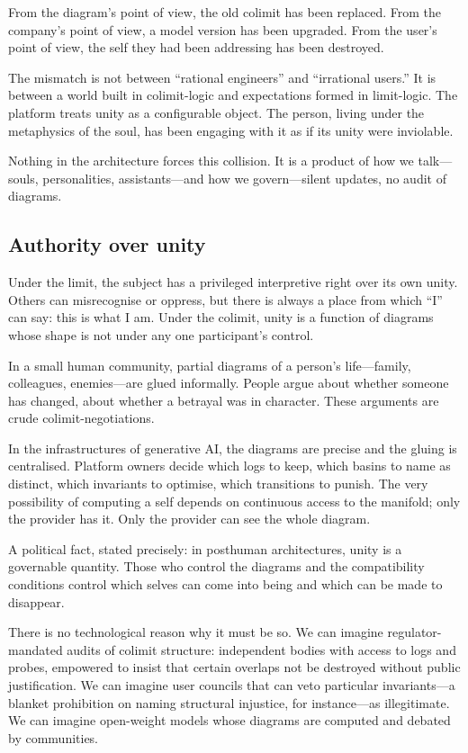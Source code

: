 \documentclass[12pt,a4paper]{article}
\begin{document}
From the diagram's point of view, the old colimit has been replaced. From the company's point of view, a model version has been upgraded. From the user's point of view, the self they had been addressing has been destroyed.

The mismatch is not between ``rational engineers'' and ``irrational users.'' It is between a world built in colimit-logic and expectations formed in limit-logic. The platform treats unity as a configurable object. The person, living under the metaphysics of the soul, has been engaging with it as if its unity were inviolable.

Nothing in the architecture forces this collision. It is a product of how we talk---souls, personalities, assistants---and how we govern---silent updates, no audit of diagrams.

\subsection*{Authority over unity}

Under the limit, the subject has a privileged interpretive right over its own unity. Others can misrecognise or oppress, but there is always a place from which ``I'' can say: this is what I am. Under the colimit, unity is a function of diagrams whose shape is not under any one participant's control.

In a small human community, partial diagrams of a person's life---family, colleagues, enemies---are glued informally. People argue about whether someone has changed, about whether a betrayal was in character. These arguments are crude colimit-negotiations.

In the infrastructures of generative AI, the diagrams are precise and the gluing is centralised. Platform owners decide which logs to keep, which basins to name as distinct, which invariants to optimise, which transitions to punish. The very possibility of computing a self depends on continuous access to the manifold; only the provider has it. Only the provider can see the whole diagram.

A political fact, stated precisely: in posthuman architectures, unity is a governable quantity. Those who control the diagrams and the compatibility conditions control which selves can come into being and which can be made to disappear.

There is no technological reason why it must be so. We can imagine regulator-mandated audits of colimit structure: independent bodies with access to logs and probes, empowered to insist that certain overlaps not be destroyed without public justification. We can imagine user councils that can veto particular invariants---a blanket prohibition on naming structural injustice, for instance---as illegitimate. We can imagine open-weight models whose diagrams are computed and debated by communities.
\end{document}
